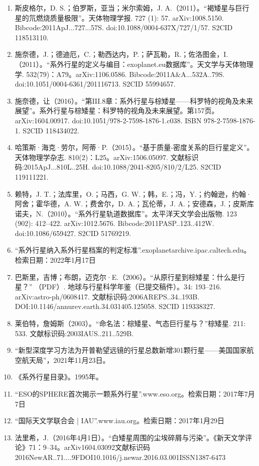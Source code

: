 \begin{enumerate}
\item 斯皮格尔，D. S.；伯罗斯，亚当；米尔索姆，J. A.（2011）。“褐矮星与巨行星的氘燃烧质量极限”。天体物理学报. 727 (1): 57. arXiv:1008.5150. Bibcode:2011ApJ...727...57S. doi:10.1088/0004-637X/727/1/57. S2CID 118513110.
\item 施奈德，J.；德迪厄，C.；勒西达内，P.；萨瓦勒，R.；佐洛图金，I.（2011）。“系外行星的定义与编目：exoplanet.eu数据库”。天文学与天体物理学. 532(79)：A79。arXiv:1106.0586. Bibcode:2011A&A...532A..79S. doi:10.1051/0004-6361/201116713. S2CID 55994657.
\item 施奈德，让（2016）。“第III.8章：系外行星与棕矮星——科罗特的视角及未来展望”。系外行星与棕矮星：科罗特的视角及未来展望。第157页。arXiv:1604.00917. doi:10.1051/978-2-7598-1876-1.c038. ISBN 978-2-7598-1876-1. S2CID 118434022.
\item 哈策斯·海克·劳尔，阿蒂·P.（2015）。“基于质量-密度关系的巨行星定义”。天体物理学杂志. 810(2)：L25。arXiv:1506.05097. 文献标识码:2015ApJ...810L..25H. doi:10.1088/2041-8205/810/2/L25. S2CID 119111221.
\item 赖特，J. T.；法库里，O.；马西，G. W.；韩，E.；冯，Y.；约翰逊，约翰·阿舍；霍华德，A. W.；费舍尔，D. A.；瓦伦蒂，J. A.；安德森，J.；皮斯库诺夫，N.（2010）。“系外行星轨道数据库”。太平洋天文学会出版物. 123 (902): 412–422. arXiv:1012.5676. Bibcode:2011PASP..123..412W. doi:10.1086/659427. S2CID 51769219.
\item “系外行星纳入系外行星档案的判定标准”.exoplanetarchive.ipac.caltech.edu。检索日期：2022年1月17日
\item 巴斯里，吉博；布朗，迈克尔·E.（2006）。“从原行星到棕矮星：什么是行星？” （PDF）. 地球与行星科学年鉴（已提交稿件）。34: 193–216. arXiv:astro-ph/0608417. 文献标识码:2006AREPS..34..193B. DOI:10.1146/annurev.earth.34.031405.125058. S2CID 119338327.
\item 莱伯特，詹姆斯（2003）。“命名法：棕矮星、气态巨行星与？”棕矮星. 211: 533. 文献标识码:2003IAUS..211..529B.
\item “新型深度学习方法为开普勒望远镜的行星总数新增301颗行星——美国国家航空航天局”，2021年11月23日。
\item 《系外行星目录》。1995年。
\item “ESO的SPHERE首次揭示一颗系外行星”.www.eso.org。检索日期：2017年7月7日
\item “国际天文学联合会 | IAU”.www.iau.org。检索日期：2017年1月29日
\item 法里希，J.（2016年4月1日）。“白矮星周围的尘埃碎屑与污染”。《新天文学评论》71：9–34。arXiv1604.03092文献标识码2016NewAR..71....9FDOI10.1016/j.newar.2016.03.001ISSN1387-6473

\end{enumerate}
